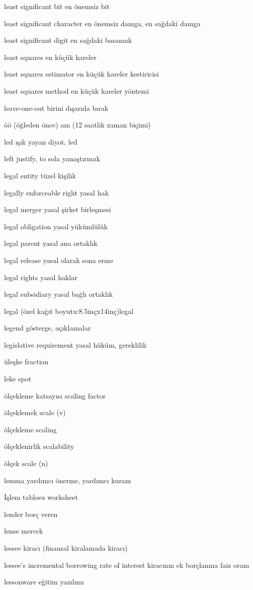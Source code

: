 \documentclass[12pt,fleqn]{article}\usepackage{../../common}
\begin{document}
least significant bit en önemsiz bit

least significant character en önemsiz damga, en sağdaki damga

least significant digit en sağdaki basamak

least squares en küçük kareler

least squares estimator en küçük kareler kestiricisi

least squares method en küçük kareler yöntemi

leave-one-out birini dışarıda bırak

öö (öğleden önce) am (12 saatlik zaman biçimi)

led ışık yayan diyot, led

left justify, to sola yanaştırmak

legal entity tüzel kişilik

legally enforceable right yasal hak

legal merger yasal şirket birleşmesi

legal obligation yasal yükümlülük

legal parent yasal ana ortaklık

legal release yasal olarak sona erme

legal rights yasal haklar

legal subsidiary yasal bağlı ortaklık

legal (özel kağıt boyutu:8.5inçx14inç)legal

legend gösterge, açıklamalar

legislative requirement yasal hüküm, gereklilik

üleşke fraction

leke spot

ölçekleme katsayısı scaling factor

ölçeklemek scale (v)

ölçekleme scaling

ölçeklenirlik scalability

ölçek scale (n)

lemma yardımcı önerme, yardımcı kuram

İşlem tablosu worksheet

lender borç veren

lense mercek

lessee kiracı (finansal kiralamada kiracı)

lessee's incremental borrowing rate of interest kiracının ek borçlanma faiz oranı

lessonware eğitim yazılımı
\end{document}
